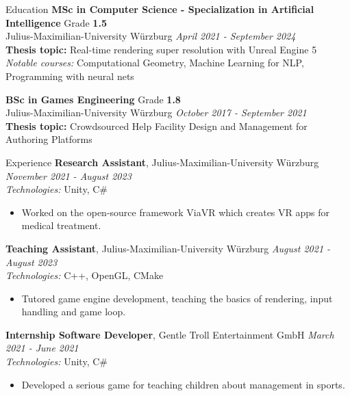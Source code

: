 \documentclass{resume} %
\begin{document}
\begin{rSection}{Education}
{\bf MSc in Computer Science - Specialization in Artificial Intelligence} \hfill {Grade \bf1.5} 
\\ Julius-Maximilian-University Würzburg \hfill {\em April 2021 - September 2024}
\\ {\small {\bf Thesis topic:} Real-time rendering super resolution with Unreal Engine 5}
\\ {\small {\em Notable courses:} Computational Geometry, Machine Learning for NLP, Programming with neural nets} 

{\bf BSc in Games Engineering} \hfill {Grade \bf 1.8} 
\\ Julius-Maximilian-University Würzburg \hfill {\em October 2017 - September 2021}
\\ {\small {\bf Thesis topic:} Crowdsourced Help Facility Design and Management for Authoring Platforms}
\end{rSection}

\begin{rSection}{Experience}
{\bf Research Assistant}{, Julius-Maximilian-University Würzburg} \hfill {\em November 2021 - August 2023}\\
{\small {\em Technologies:} Unity, C\#} 
\begin{itemize}
    \item \small Worked on the open-source framework ViaVR which creates VR apps for medical treatment.
\end{itemize}
{\bf Teaching Assistant}{, Julius-Maximilian-University Würzburg} \hfill {\em August 2021 - August 2023}\\
{\small {\em Technologies:} C++, OpenGL, CMake}
\begin{itemize}
    \item \small Tutored game engine development, teaching the basics of rendering, input handling and game loop.
\end{itemize}
{\bf Internship Software Developer}{, Gentle Troll Entertainment GmbH} \hfill {\em March 2021 - June 2021}\\
{\small {\em Technologies:} Unity, C\#}
\begin{itemize}
    \item \small Developed a serious game for teaching children about management in sports.
\end{itemize}
\end{rSection}
\end{document}
